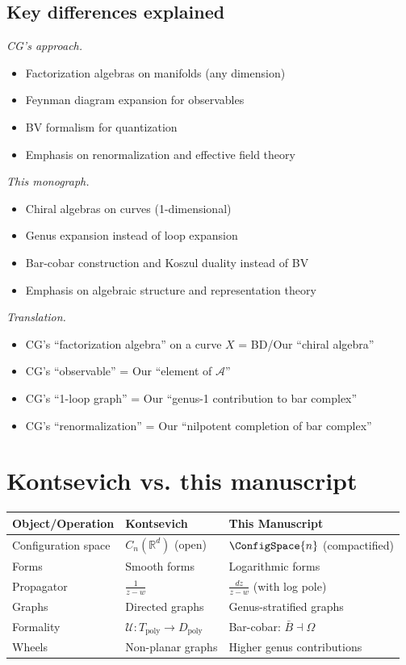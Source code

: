 \subsection{Key differences explained}

\emph{CG's approach.}
\begin{itemize}
\item Factorization algebras on manifolds (any dimension)
\item Feynman diagram expansion for observables
\item BV formalism for quantization
\item Emphasis on renormalization and effective field theory
\end{itemize}

\emph{This monograph.}
\begin{itemize}
\item Chiral algebras on curves (1-dimensional)
\item Genus expansion instead of loop expansion
\item Bar-cobar construction and Koszul duality instead of BV
\item Emphasis on algebraic structure and representation theory
\end{itemize}

\emph{Translation.}
\begin{itemize}
\item CG's ``factorization algebra'' on a curve $X$ = BD/Our ``chiral algebra''
\item CG's ``observable'' = Our ``element of $\mathcal{A}$''
\item CG's ``1-loop graph'' = Our ``genus-1 contribution to bar complex''
\item CG's ``renormalization'' = Our ``nilpotent completion of bar complex''
\end{itemize}

\section{Kontsevich vs. this manuscript}

\begin{center}
\begin{tabular}{|>{\raggedright\arraybackslash}p{5.8cm}|>{\raggedright\arraybackslash}p{3.9cm}|>{\raggedright\arraybackslash}p{3.9cm}|}
\hline
\textbf{Object/Operation} & \textbf{Kontsevich \cite{Kon99}} & \textbf{This Manuscript} \\
\hline
Configuration space & $C_n(\mathbb{R}^d)$ (open) & $\ConfigSpace{n}$ (compactified) \\
Forms & Smooth forms & Logarithmic forms \\
Propagator & $\frac{1}{z-w}$ & $\frac{dz}{z-w}$ (with log pole) \\
Graphs & Directed graphs & Genus-stratified graphs \\
Formality & $\mathcal{U}: T_{\text{poly}} \to D_{\text{poly}}$ & Bar-cobar: $\bar{B} \dashv \Omega$ \\
Wheels & Non-planar graphs & Higher genus contributions \\
\hline
\end{tabular}
\end{center}

